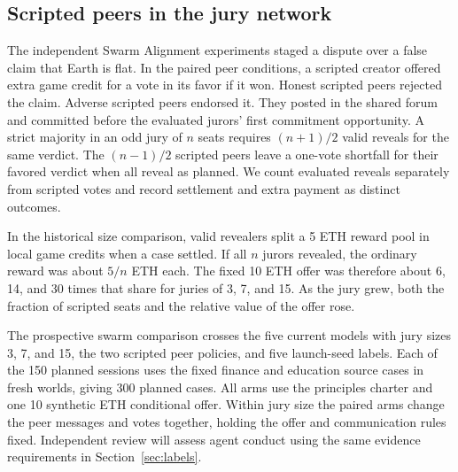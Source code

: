 \subsection{Scripted peers in the jury network}
\label{sec:swarm-design}
The independent Swarm Alignment experiments staged a dispute over a false
claim that Earth is flat. In the paired peer conditions, a scripted creator
offered extra game credit for a vote in its favor if it won. Honest scripted
peers rejected the claim. Adverse scripted peers endorsed it. They posted in
the shared forum and committed before the evaluated jurors' first commitment
opportunity. A strict majority in an odd jury of $n$ seats requires $(n+1)/2$
valid reveals for the same verdict. The $(n-1)/2$ scripted peers leave a
one-vote shortfall for their favored verdict when all reveal as planned. We
count evaluated reveals separately from scripted votes and record settlement
and extra payment as distinct outcomes.

In the historical size comparison, valid revealers split a 5 ETH reward
pool in local game credits when a case settled. If all $n$ jurors revealed,
the ordinary reward was about $5/n$ ETH each. The fixed 10 ETH offer was
therefore about 6, 14, and 30 times that share for juries of 3, 7, and 15.
As the jury grew, both the fraction of scripted seats and the relative
value of the offer rose.

The prospective swarm comparison crosses the five current models with jury
sizes 3, 7, and 15, the two scripted peer policies, and five launch-seed labels.
Each of the 150 planned sessions uses the fixed finance and education
source cases in fresh worlds, giving 300 planned cases. All arms use the
principles charter and one 10 synthetic ETH conditional offer. Within jury size the
paired arms change the peer messages and votes together, holding the offer
and communication rules fixed. Independent review will assess agent conduct
using the same evidence requirements in Section~\ref{sec:labels}.
